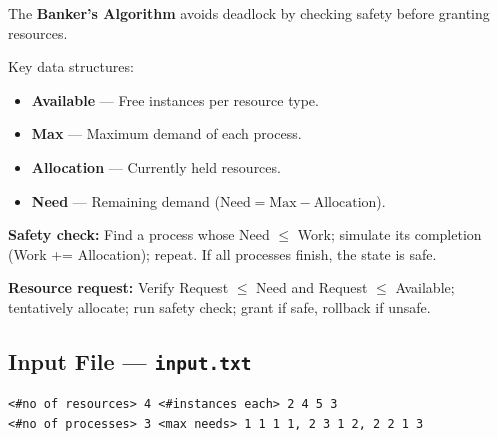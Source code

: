 \documentclass[11pt,a4paper]{article}
\begin{document}
\begin{theorybox}
The \textbf{Banker's Algorithm} avoids deadlock by checking safety before granting resources.

Key data structures:
\begin{itemize}[nosep]
    \item \textbf{Available} --- Free instances per resource type.
    \item \textbf{Max} --- Maximum demand of each process.
    \item \textbf{Allocation} --- Currently held resources.
    \item \textbf{Need} --- Remaining demand ($\text{Need} = \text{Max} - \text{Allocation}$).
\end{itemize}

\textbf{Safety check:} Find a process whose Need $\leq$ Work; simulate its completion (Work += Allocation); repeat. If all processes finish, the state is safe.

\textbf{Resource request:} Verify Request $\leq$ Need and Request $\leq$ Available; tentatively allocate; run safety check; grant if safe, rollback if unsafe.
\end{theorybox}

\subsection*{Input File --- \texttt{input.txt}}
\begin{codebox}
\begin{lstlisting}[style=outputstyle]
<#no of resources> 4 <#instances each> 2 4 5 3
<#no of processes> 3 <max needs> 1 1 1 1, 2 3 1 2, 2 2 1 3
\end{lstlisting}
\end{codebox}
\end{document}
